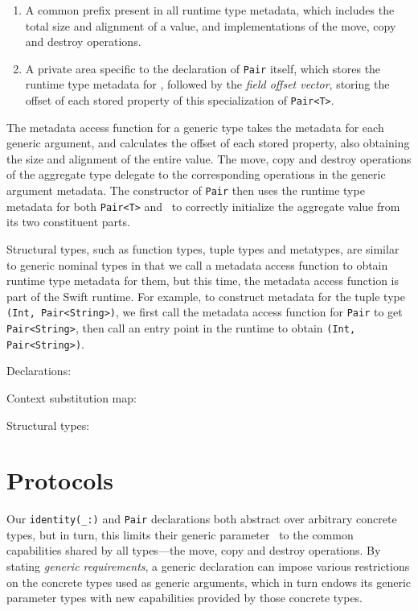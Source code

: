 \documentclass[../generics]{subfiles}
\begin{document}
\begin{enumerate}
\item A common prefix present in all runtime type metadata, which includes the total size and alignment of a value, and implementations of the move, copy and destroy operations.
\item A private area specific to the declaration of \texttt{Pair} itself, which stores the runtime type metadata for \tT, followed by the \emph{field offset vector}, storing the offset of each stored property of this specialization of \texttt{Pair<T>}.
\end{enumerate}

The metadata access function for a generic type takes the metadata for each generic argument, and calculates the offset of each stored property, also obtaining the size and alignment of the entire value. The move, copy and destroy operations of the aggregate type delegate to the corresponding operations in the generic argument metadata. The constructor of \texttt{Pair} then uses the runtime type metadata for both \texttt{Pair<T>} and \tT\ to correctly initialize the aggregate value from its two constituent parts.

Structural types, such as function types, tuple types and metatypes, are similar to generic nominal types in that we call a metadata access function to obtain runtime type metadata for them, but this time, the metadata access function is part of the Swift runtime. For example, to construct metadata for the tuple type \texttt{(Int, Pair<String>)}, we first call the metadata access function for \texttt{Pair} to get \texttt{Pair<String>}, then call an entry point in the runtime to obtain \texttt{(Int, Pair<String>)}.

\begin{MoreDetails}
\item Declarations: 
\item Context substitution map: 
\item Structural types: 
\end{MoreDetails}

\section{Protocols}\label{intro protocols}

Our \verb|identity(_:)| and \texttt{Pair} declarations both abstract over arbitrary concrete types, but in turn, this limits their generic parameter \tT\ to the common capabilities shared by all types---the move, copy and destroy operations. By stating \emph{generic requirements}, a generic declaration can impose various restrictions on the concrete types used as generic arguments, which in turn endows its generic parameter types with new capabilities provided by those concrete types.
\end{document}
